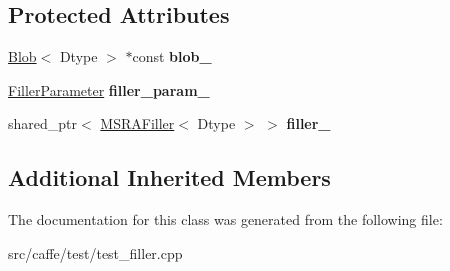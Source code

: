 \subsection*{Protected Attributes}
\begin{DoxyCompactItemize}
\item 
\mbox{\label{classcaffe_1_1_m_s_r_a_filler_test_a17e3804ac46f29c0d8fb78d85d1dccc6}} 
\mbox{\hyperlink{classcaffe_1_1_blob}{Blob}}$<$ Dtype $>$ $\ast$const {\bfseries blob\+\_\+}
\item 
\mbox{\label{classcaffe_1_1_m_s_r_a_filler_test_a861322e864e2b1a5e09884f10765fc39}} 
\mbox{\hyperlink{classcaffe_1_1_filler_parameter}{Filler\+Parameter}} {\bfseries filler\+\_\+param\+\_\+}
\item 
\mbox{\label{classcaffe_1_1_m_s_r_a_filler_test_a3c1e6fe6cb201ac2b2a12c50f8df8b96}} 
shared\+\_\+ptr$<$ \mbox{\hyperlink{classcaffe_1_1_m_s_r_a_filler}{M\+S\+R\+A\+Filler}}$<$ Dtype $>$ $>$ {\bfseries filler\+\_\+}
\end{DoxyCompactItemize}
\subsection*{Additional Inherited Members}


The documentation for this class was generated from the following file\+:\begin{DoxyCompactItemize}
\item 
src/caffe/test/test\+\_\+filler.\+cpp\end{DoxyCompactItemize}
